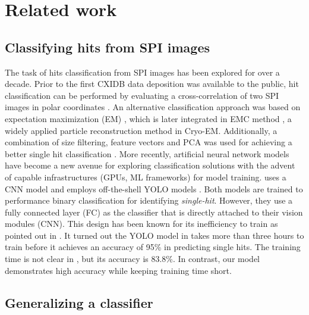 \section{Related work}

\subsection{Classifying hits from SPI images}

The task of hits classification from SPI images has been explored for over a
decade. Prior to the first CXIDB data deposition
\cite{seibertSingleMimivirusParticles2011} was available to the public, hit
classification can be performed by evaluating a cross-correlation of two SPI
images in polar coordinates \cite{bortelClassificationAveragingRandom2009}.  An
alternative classification approach was based on expectation maximization (EM)
\cite{dempsterMaximumLikelihoodIncomplete1977}, which is later integrated in EMC
method \cite{lohReconstructionAlgorithmSingleparticle2009}, a widely applied
particle reconstruction method in Cryo-EM.  Additionally, a combination of size
filtering, feature vectors and PCA was used for achieving a better single hit
classification \cite{bobkovSortingAlgorithmsSingleparticle2015}.  More recently,
artificial neural network models have become a new avenue for exploring
classification solutions with the advent of capable infrastructures (GPUs, ML
frameworks) for model training. \cite{shiEvaluationPerformanceClassification2019}
uses a CNN model  and \cite{ignatenkoClassificationDiffractionPatterns2021}
employs off-the-shell YOLO models \cite{redmonYOLO9000BetterFaster2016,
redmonYOLOv3IncrementalImprovement2018}.  Both models are trained to performance
binary classification for identifying \textit{single-hit}.  However, they use a
fully connected layer (FC) as the classifier that is directly attached to their
vision modules (CNN).  This design has been known for its inefficiency to train
as pointed out in \cite{schroffFaceNetUnifiedEmbedding2015}.  It turned out the
YOLO model in \cite{ignatenkoClassificationDiffractionPatterns2021} takes more
than three hours to train before it achieves an accuracy of 95\% in predicting
single hits.  The training time is not clear in
\cite{shiEvaluationPerformanceClassification2019}, but its accuracy is 83.8\%.
In contrast, our model demonstrates high accuracy while keeping training time
short.  


\subsection{Generalizing a classifier}

